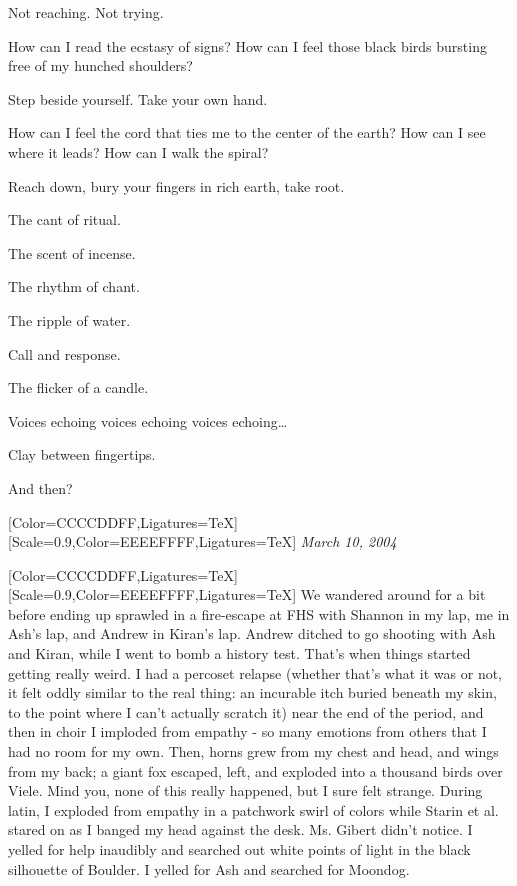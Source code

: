 \begin{paracol}{2}
\begin{leftcolumn}
\begin{ally}
Not reaching. Not trying.
\end{ally}
How can I read the ecstasy of signs? How can I feel those black birds bursting free of my hunched shoulders?

\begin{ally}
Step beside yourself. Take your own hand.
\end{ally}
How can I feel the cord that ties me to the center of the earth? How can I see where it leads? How can I walk the spiral?

\begin{ally}
Reach down, bury your fingers in rich earth, take root.
\end{ally}
The cant of ritual.

\begin{ally}
The scent of incense.
\end{ally}
The rhythm of chant.

\begin{ally}
The ripple of water.
\end{ally}
Call and response.

\begin{ally}
The flicker of a candle.
\end{ally}
Voices echoing voices echoing voices echoing\ldots{}

\begin{ally}
Clay between fingertips.
\end{ally}
And then?
\newpage
\end{leftcolumn}
\begin{rightcolumn*}
  [Color=CCCCDDFF,Ligatures=TeX]
  \renewfontfamily{}[Scale=0.9,Color=EEEEFFFF,Ligatures=TeX]
    \emph{March 10, 2004}
\end{rightcolumn*}
\begin{leftcolumn}
  [Color=CCCCDDFF,Ligatures=TeX]
  \renewfontfamily{}[Scale=0.9,Color=EEEEFFFF,Ligatures=TeX]
\noindent We wandered around for a bit before ending up sprawled in a fire-escape at FHS with Shannon in my lap, me in Ash's lap, and Andrew in Kiran's lap. Andrew ditched to go shooting with Ash and Kiran, while I went to bomb a history test. That's when things started getting really weird. I had a percoset relapse (whether that's what it was or not, it felt oddly similar to the real thing: an incurable itch buried beneath my skin, to the point where I can't actually scratch it) near the end of the period, and then in choir I imploded from empathy - so many emotions from others that I had no room for my own. Then, horns grew from my chest and head, and wings from my back; a giant fox escaped, left, and exploded into a thousand birds over Viele. Mind you, none of this really happened, but I sure felt strange. During latin, I exploded from empathy in a patchwork swirl of colors while Starin et al. stared on as I banged my head against the desk. Ms. Gibert didn't notice. I yelled for help inaudibly and searched out white points of light in the black silhouette of Boulder. I yelled for Ash and searched for Moondog.


\end{leftcolumn}
\end{paracol}
